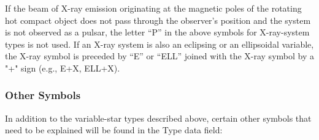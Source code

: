 If the beam of X-ray emission originating at the magnetic poles of the
rotating hot compact object does not pass through the observer's
position and the system is not observed as a pulsar, the letter ``P'' in
the above symbols for X-ray-system types is not used. If an X-ray
system is also an eclipsing or an ellipsoidal variable, the X-ray symbol
is preceded by ``E'' or ``ELL'' joined with the X-ray symbol by a "+"
sign (e.g., E+X, ELL+X).

\subsubsection{Other Symbols}\label{other-symbols}

In addition to the variable-star types described above, certain other
symbols that need to be explained will be found in the Type data field:

